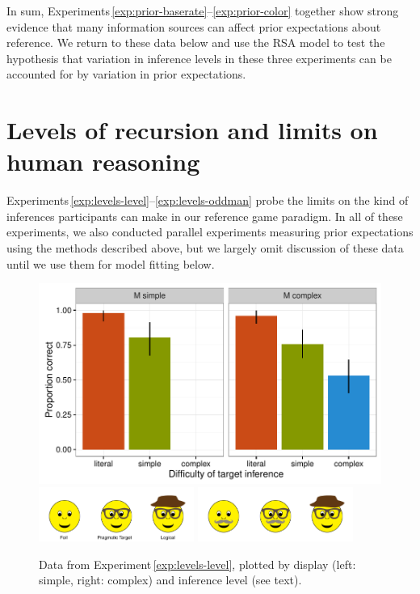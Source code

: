 \documentclass[man,noapacite]{apa2}
\newcounter{Experiment}
\newcommand{\exptref}[1]{Experiment\,\ref{#1}}
\newcommand{\exptrefrange}[2]{Experiments\,\ref{#1}--\ref{#2}}
\begin{document}
In sum, \exptrefrange{exp:prior-baserate}{exp:prior-color} together show strong evidence that many information sources can affect prior expectations about reference. We return to these data below and use the RSA model to test the hypothesis that variation in inference levels in these three experiments can be accounted for by variation in prior expectations.


\section{Levels of recursion and limits on human reasoning}
\label{sec:levels}

\exptrefrange{exp:levels-level}{exp:levels-oddman} probe the limits on the kind of inferences participants can make in our reference game paradigm. In all of these experiments, we also conducted parallel experiments measuring prior expectations using the methods described above, but we largely omit discussion of these data until we use them for model fitting below.


 \begin{figure}[t]
  \centering
  \includegraphics[width=5in]{../plots/3-levels-levels.pdf}\\
  \hspace{6ex} \includegraphics[width=2in]{figures/hatglasses.pdf}\hspace{2ex}
  \includegraphics[width=2in]{figures/levels-levels-stim.pdf}
  \caption{\label{fig:levels-level} Data from \exptref{exp:levels-level}, plotted by display (left: simple, right: complex) and inference level (see text).}
\end{figure}
\end{document}
